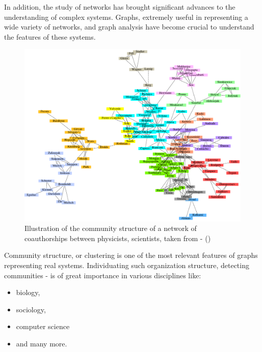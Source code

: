 In addition, the study of networks has brought significant advances to the understanding of complex systems.
Graphs, extremely useful in representing a wide variety of networks, and graph analysis have become crucial to understand the features of these systems.

\begin{figure}[H]%
	\centering%
	\includegraphics[width=1\textwidth-4pt,%
		bgcolor=white,%
		cfbox=lightestgray %
			  2pt %
			  0pt %
			  0pt %
	]{images/chapter1/NewmanGirvan2004page12.pdf}%
	\caption[Illustration of the community structure of a network of coauthorships between physicists, scientists]{Illustration of the community structure of a network of coauthorships between physicists, scientists, taken from  - \citeauthor{NewmanGirvan2004} (\citeyear{NewmanGirvan2004})}%
	\label{fig:NewmanGirvan2004page12}%
\end{figure}%
Community structure, or clustering is one of the most relevant features of graphs representing real systems.
Individuating such organization structure, detecting communities - is of great importance in various disciplines like:
 \begin{itemize}[noitemsep]
	\item biology,
	\item sociology, 
	\item computer science
	\item and many more.
\end{itemize}
  
